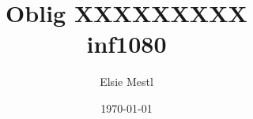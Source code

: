 \documentclass[a4paper, norsk, 10pt]{article}
\date{\today}
\title{Oblig XXXXXXXXX \\ inf1080}
\author{Elsie Mestl}
\begin{document}
\maketitle
\begin{flushleft}



\end{flushleft}
\end{document}
